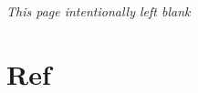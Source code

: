 \documentclass[ oneside,titlepage,numbers=noenddot,headinclude,%
   footinclude=false,
   BCOR=5mm,paper=a4,fontsize=11pt,11pt,a4paper,american
]{scrreprt}
\begin{document}
\frenchspacing
\raggedbottom
\pagestyle{plain}
\thispagestyle{empty}


\pagestyle{scrheadings}
\cleardoublepage

\thispagestyle{empty}

\begin{center}
   \emph{This page intentionally left blank}
\end{center}

\tableofcontents




\chapter{Ref}


\end{document}
